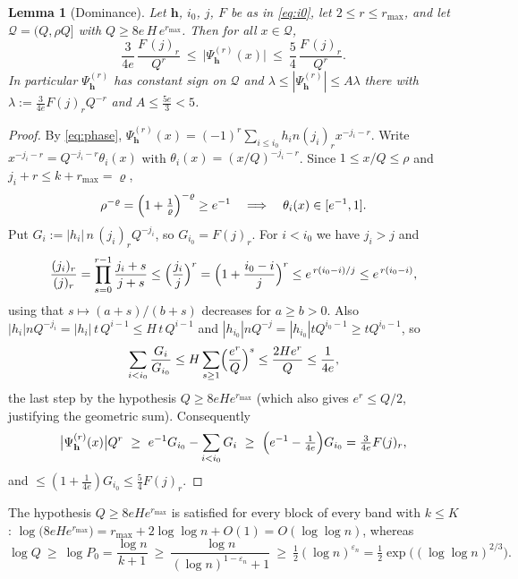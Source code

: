 \documentclass[11pt]{article}
\newtheorem{lemma}[theorem]{Lemma}
\theoremstyle{definition}
\theoremstyle{plain}
\begin{document}
\begin{lemma}[Dominance]\label{lem:dominance}
Let $\mathbf h$, $i_{0}$, $j$, $F$ be as in \eqref{eq:i0}, let $2\le r\le
r_{\max}$, and let $\mathcal Q=(Q,\rho Q]$ with $Q\ge8e\,H\,e^{r_{\max}}$.
Then for all $x\in\mathcal Q$,
\[
\frac{3}{4e}\,\frac{F\,(j)_{r}}{Q^{r}}
\ \le\ \bigl|\Psi_{\mathbf h}^{(r)}(x)\bigr|
\ \le\ \frac{5}{4}\,\frac{F\,(j)_{r}}{Q^{r}} .
\]
In particular $\Psi_{\mathbf h}^{(r)}$ has constant sign on $\mathcal Q$ and
$\lambda\le|\Psi_{\mathbf h}^{(r)}|\le A\lambda$ there with
$\lambda:=\frac{3}{4e}F(j)_{r}Q^{-r}$ and $A\le\frac{5e}{3}<5$.
\end{lemma}

\begin{proof}
By \eqref{eq:phase},
$\Psi_{\mathbf h}^{(r)}(x)=(-1)^{r}\sum_{i\le i_{0}}h_{i}n(j_{i})_{r}
x^{-j_{i}-r}$.  Write $x^{-j_{i}-r}=Q^{-j_{i}-r}\theta_{i}(x)$ with
$\theta_{i}(x)=(x/Q)^{-j_{i}-r}$.  Since $1\le x/Q\le\rho$ and
$j_{i}+r\le k+r_{\max}=\varrho$,
\[
\rho^{-\varrho}=\Bigl(1+\tfrac1\varrho\Bigr)^{-\varrho}\ge e^{-1}
\quad\Longrightarrow\quad \theta_{i}(x)\in[e^{-1},1].
\]
Put $G_{i}:=|h_{i}|\,n\,(j_{i})_{r}Q^{-j_{i}}$, so
$G_{i_{0}}=F(j)_{r}$.  For $i<i_{0}$ we have $j_{i}>j$ and
\[
\frac{(j_{i})_{r}}{(j)_{r}}=\prod_{s=0}^{r-1}\frac{j_{i}+s}{j+s}
\le\Bigl(\frac{j_{i}}{j}\Bigr)^{r}
=\Bigl(1+\frac{i_{0}-i}{j}\Bigr)^{r}\le e^{\,r(i_{0}-i)/j}
\le e^{\,r(i_{0}-i)},
\]
using that $s\mapsto(a+s)/(b+s)$ decreases for $a\ge b>0$.  Also
$|h_{i}|n Q^{-j_{i}}=|h_{i}|\,t\,Q^{i-1}\le H\,t\,Q^{i-1}$ and
$|h_{i_{0}}|nQ^{-j}=|h_{i_{0}}|tQ^{i_{0}-1}\ge tQ^{i_{0}-1}$, so
\[
\sum_{i<i_{0}}\frac{G_{i}}{G_{i_{0}}}
\le H\sum_{s\ge1}\Bigl(\frac{e^{r}}{Q}\Bigr)^{s}
\le\frac{2He^{r}}{Q}\le\frac{1}{4e},
\]
the last step by the hypothesis $Q\ge8eHe^{r_{\max}}$ (which also gives
$e^{r}\le Q/2$, justifying the geometric sum).  Consequently
\[
\bigl|\Psi^{(r)}_{\mathbf h}(x)\bigr|Q^{r}
\ \ge\ e^{-1}G_{i_{0}}-\sum_{i<i_{0}}G_{i}
\ \ge\ \Bigl(e^{-1}-\tfrac{1}{4e}\Bigr)G_{i_{0}}
=\tfrac{3}{4e}F(j)_{r},
\]
and $\le(1+\tfrac{1}{4e})G_{i_{0}}\le\tfrac54F(j)_{r}$.
\end{proof}

The hypothesis $Q\ge8eHe^{r_{\max}}$ is satisfied for every block of every
band with $k\le K$: $\log\bigl(8eHe^{r_{\max}}\bigr)
=r_{\max}+2\log\log n+O(1)=O(\log\log n)$, whereas
\begin{equation}\label{eq:logQ}
\log Q\ \ge\ \log P_{0}=\frac{\log n}{k+1}\ \ge\
\frac{\log n}{(\log n)^{1-\varepsilon_{n}}+1}\ \ge\
\tfrac12(\log n)^{\varepsilon_{n}}
=\tfrac12\exp\bigl((\log\log n)^{2/3}\bigr).
\end{equation}
\end{document}
